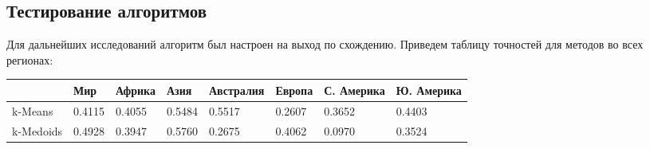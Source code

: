 \documentclass[12pt, a4paper]{article}
\begin{document}
		\newpage
		\subsection{Тестирование алгоритмов}
		\label{sssec:test}
			Для дальнейших исследований алгоритм был настроен на выход по схождению.
			Приведем таблицу точностей для методов во всех регионах:

			\begin{center}
			\begin{tabular}{| l | l | l | l | l | l | l | l |}
			\hline
			& Мир & Африка & Азия & Австралия & Европа & С. Америка & Ю. Америка \\
			\hline
			k-Means & 0.4115 & 0.4055 & 0.5484 & 0.5517 & 0.2607 & 0.3652 & 0.4403 \\
			\hline
			k-Medoids & 0.4928 & 0.3947 & 0.5760 & 0.2675 & 0.4062 & 0.0970 & 0.3524 \\
			\hline
			\end{tabular}
			\end{center}
\end{document}
